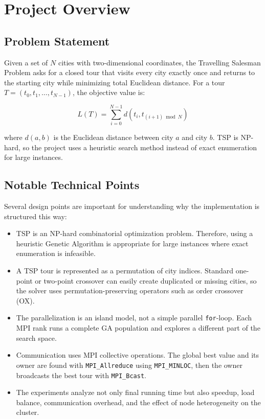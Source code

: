 \documentclass[11pt,a4paper]{article}
\begin{document}
\newpage

\tableofcontents

\section{Project Overview}

\subsection{Problem Statement}
Given a set of $N$ cities with two-dimensional coordinates, the Travelling
Salesman Problem asks for a closed tour that visits every city exactly once and
returns to the starting city while minimizing total Euclidean distance. For a
tour $T = (t_0, t_1, \ldots, t_{N-1})$, the objective value is:

\[
  L(T) = \sum_{i=0}^{N-1} d(t_i, t_{(i+1) \bmod N})
\]

where $d(a,b)$ is the Euclidean distance between city $a$ and city $b$.
TSP is NP-hard, so the project uses a heuristic search method instead of exact
enumeration for large instances.

\subsection{Notable Technical Points}
Several design points are important for understanding why the implementation is
structured this way:

\begin{itemize}[leftmargin=*]
  \item TSP is an NP-hard combinatorial optimization problem. Therefore, using a
  heuristic Genetic Algorithm is appropriate for large instances where exact
  enumeration is infeasible.
  \item A TSP tour is represented as a permutation of city indices. Standard
  one-point or two-point crossover can easily create duplicated or missing
  cities, so the solver uses permutation-preserving operators such as order
  crossover (OX).
  \item The parallelization is an island model, not a simple parallel
  \texttt{for}-loop. Each MPI rank runs a complete GA population and explores a
  different part of the search space.
  \item Communication uses MPI collective operations. The global best value and
  its owner are found with \texttt{MPI\_Allreduce} using
  \texttt{MPI\_MINLOC}, then the owner broadcasts the best tour with
  \texttt{MPI\_Bcast}.
  \item The experiments analyze not only final running time but also speedup,
  load balance, communication overhead, and the effect of node heterogeneity on
  the cluster.
\end{itemize}
\end{document}
